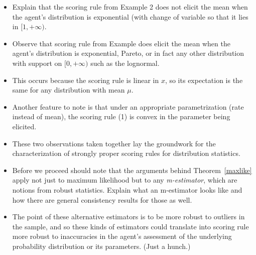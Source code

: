 \begin{itemize}
\item Explain that the scoring rule from Example 2 does not elicit the mean when the agent's distribution is exponential (with change of variable so that it lies in $[1,+\infty)$. 
\item Observe that scoring rule from Example does elicit the mean when the agent's distribution is exponential, Pareto, or in fact any other distribution with support on $[0,+\infty)$ such as the lognormal. 
\item This occurs because the scoring rule is linear in $x$, so its expectation is the same for any distribution with mean $\mu$. 
\item Another feature to note is that under an appropriate parametrization (rate instead of mean), the scoring rule (1) is convex in the parameter being elicited. 
\item These two observations taken together lay the groundwork for the characterization of strongly proper scoring rules for distribution statistics. 
\item Before we proceed should note that the arguments behind Theorem~\ref{maxlike} apply not just to maximum likelihood but to any \emph{m-estimator}, which are notions from robust statistics. Explain what an m-estimator looks like and how there are general consistency results for those as well.
\item The point of these alternative estimators is to be more robust to outliers in the sample, and so these kinds of estimators could translate into scoring rule more robust to inaccuracies in the agent's assessment of the underlying probability distribution or its parameters. (Just a hunch.)
\end{itemize}
